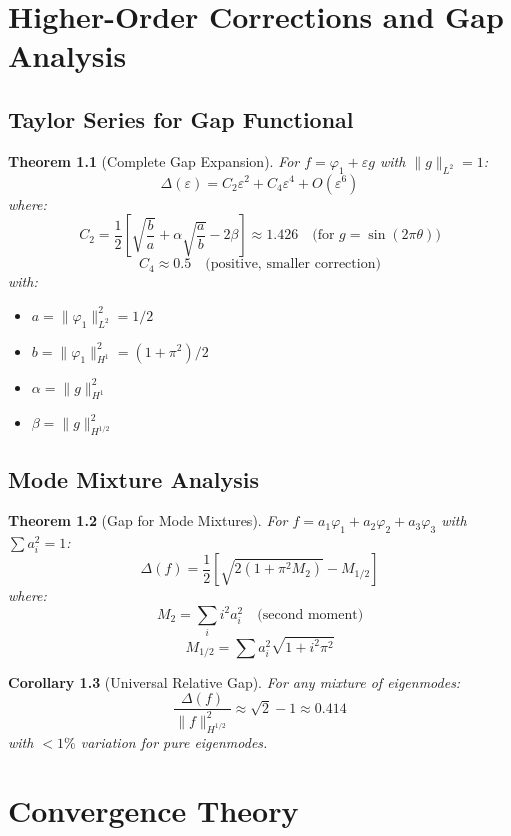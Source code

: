 ﻿\documentclass[12pt,a4paper]{report}
\theoremstyle{plain}
\newtheorem{theorem}{Theorem}[section]
\newtheorem{corollary}[theorem]{Corollary}
\theoremstyle{definition}
\begin{document}
\chapter{Higher-Order Corrections and Gap Analysis}
\label{ch:gaps}

\section{Taylor Series for Gap Functional}

\begin{theorem}[Complete Gap Expansion]
\label{thm:gap_expansion}
For $f = \varphi_1 + \varepsilon g$ with $\|g\|_{L^2} = 1$:
\[
\Delta(\varepsilon) = C_2\varepsilon^2 + C_4\varepsilon^4 + O(\varepsilon^6)
\]
where:
\[
C_2 = \frac{1}{2}\left[\sqrt{\frac{b}{a}} + \alpha\sqrt{\frac{a}{b}} - 2\beta\right] \approx 1.426 \quad \text{(for } g = \sin(2\pi\theta)\text{)}
\]
\[
C_4 \approx 0.5 \quad \text{(positive, smaller correction)}
\]
with:
\begin{itemize}
    \item $a = \|\varphi_1\|_{L^2}^2 = 1/2$
    \item $b = \|\varphi_1\|_{H^1}^2 = (1+\pi^2)/2$
    \item $\alpha = \|g\|_{H^1}^2$
    \item $\beta = \|g\|_{H^{1/2}}^2$
\end{itemize}
\end{theorem}

\section{Mode Mixture Analysis}

\begin{theorem}[Gap for Mode Mixtures]
\label{thm:mode_mixture}
For $f = a_1\varphi_1 + a_2\varphi_2 + a_3\varphi_3$ with $\sum a_i^2 = 1$:
\[
\Delta(f) = \frac{1}{2}\left[\sqrt{2(1+\pi^2 M_2)} - M_{1/2}\right]
\]
where:
\[
M_2 = \sum_i i^2 a_i^2 \quad \text{(second moment)}
\]
\[
M_{1/2} = \sum a_i^2 \sqrt{1 + i^2\pi^2}
\]
\end{theorem}

\begin{corollary}[Universal Relative Gap]
For any mixture of eigenmodes:
\[
\frac{\Delta(f)}{\|f\|_{H^{1/2}}^2} \approx \sqrt{2} - 1 \approx 0.414
\]
with $< 1\%$ variation for pure eigenmodes.
\end{corollary}

\chapter{Convergence Theory}
\label{ch:convergence}
\end{document}
